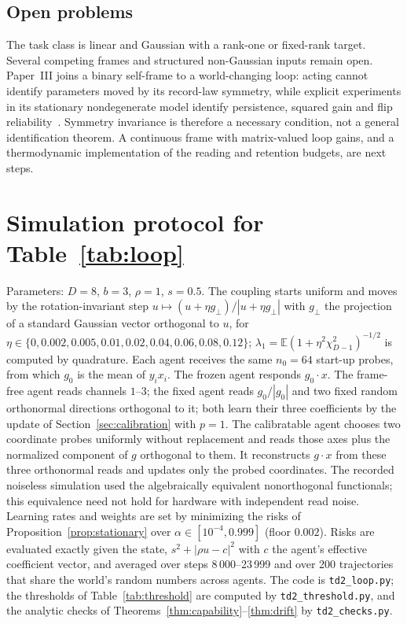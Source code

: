 \documentclass[12pt]{article}
\theoremstyle{definition}
\newcommand{\E}{\mathbb E}
\begin{document}
\subsection{Open problems}

The task class is linear and Gaussian with a rank-one or fixed-rank target. Several competing frames and structured non-Gaussian inputs remain open. Paper~III joins a binary self-frame to a world-changing loop: acting cannot identify parameters moved by its record-law symmetry, while explicit experiments in its stationary nondegenerate model identify persistence, squared gain and flip reliability~\cite{Liu2026TDOME_III}. Symmetry invariance is therefore a necessary condition, not a general identification theorem. A continuous frame with matrix-valued loop gains, and a thermodynamic implementation of the reading and retention budgets, are next steps.

\appendix
\section{Simulation protocol for Table~\ref{tab:loop}}
\label{app:protocol}

Parameters: $D=8$, $b=3$, $\rho=1$, $s=0.5$. The coupling starts uniform and moves by the rotation-invariant step $u\mapsto(u+\eta g_\perp)/|u+\eta g_\perp|$ with $g_\perp$ the projection of a standard Gaussian vector orthogonal to $u$, for $\eta\in\{0,0.002,0.005,0.01,0.02,0.04,0.06,0.08,0.12\}$; $\lambda_1=\E(1+\eta^2\chi^2_{D-1})^{-1/2}$ is computed by quadrature. Each agent receives the same $n_0=64$ start-up probes, from which $g_0$ is the mean of $y_ix_i$. The frozen agent responds $g_0\cdot x$. The frame-free agent reads channels $1$--$3$; the fixed agent reads $g_0/|g_0|$ and two fixed random orthonormal directions orthogonal to it; both learn their three coefficients by the update of Section~\ref{sec:calibration} with $p=1$. The calibratable agent chooses two coordinate probes uniformly without replacement and reads those axes plus the normalized component of $g$ orthogonal to them. It reconstructs $g\cdot x$ from these three orthonormal reads and updates only the probed coordinates. The recorded noiseless simulation used the algebraically equivalent nonorthogonal functionals; this equivalence need not hold for hardware with independent read noise. Learning rates and weights are set by minimizing the risks of Proposition~\ref{prop:stationary} over $\alpha\in[10^{-4},0.999]$ (floor $0.002$). Risks are evaluated exactly given the state, $s^2+|\rho u-c|^2$ with $c$ the agent's effective coefficient vector, and averaged over steps 8\,000--23\,999 and over 200 trajectories that share the world's random numbers across agents. The code is \texttt{td2\_loop.py}; the thresholds of Table~\ref{tab:threshold} are computed by \texttt{td2\_threshold.py}, and the analytic checks of Theorems~\ref{thm:capability}--\ref{thm:drift} by \texttt{td2\_checks.py}.
\end{document}
